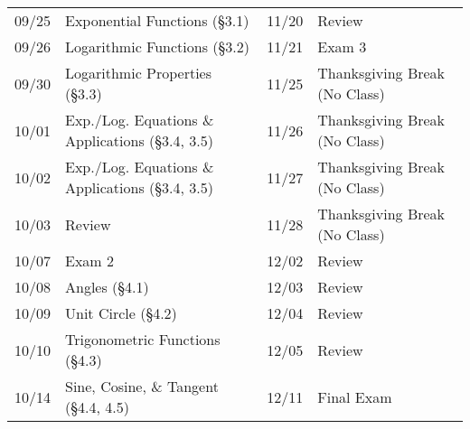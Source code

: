 \documentclass[11pt,letterpaper]{article}
\begin{document}
\begin{table}[!ht]
{\begin{tabular}{ll || ll}
	09/25 & Exponential Functions (\S3.1) & 11/20 & Review \\
	09/26 & Logarithmic Functions (\S3.2) & 11/21 & Exam 3 \\
	09/30 & Logarithmic Properties (\S3.3) & 11/25 & Thanksgiving Break (No Class) \\
	10/01 & Exp./Log. Equations \& Applications (\S3.4, 3.5) & 11/26 & Thanksgiving Break (No Class) \\
	10/02 & Exp./Log. Equations \& Applications (\S3.4, 3.5) & 11/27 & Thanksgiving Break (No Class) \\
	10/03 & Review & 11/28 & Thanksgiving Break (No Class) \\
	10/07 & Exam 2 & 12/02 & Review \\
	10/08 & Angles (\S4.1) & 12/03 & Review \\	
	10/09 & Unit Circle (\S4.2) & 12/04 & Review \\
	10/10 & Trigonometric Functions (\S4.3) & 12/05 & Review \\
	10/14 & Sine, Cosine, \& Tangent (\S4.4, 4.5) & 12/11 & Final Exam
        \end{tabular}
        }
        \end{table}
\end{document}
